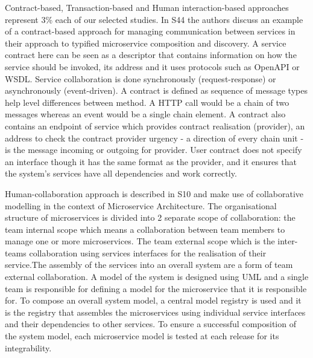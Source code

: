\documentclass{article}
\begin{document}
\begin{multicols}{2}
Contract-based, Transaction-based and Human interaction-based approaches represent 3\% each of our selected studies. In S44 the authors discuss an example of a contract-based approach for managing communication between services in their approach to typified microservice composition and discovery. A service contract here can be seen as a descriptor that contains information on how the service should be invoked, its address and it uses protocols such as OpenAPI or WSDL. Service collaboration is done synchronously (request-response) or asynchronously (event-driven). A contract is defined as sequence of message types help level differences between method.  A HTTP call would be a chain of two messages whereas an event would be a single chain element. A contract also contains an endpoint of service which provides contract realisation (provider), an address to check the contract provider urgency - a direction of every chain unit - is the message incoming or outgoing for provider. User contract does not specify an interface though it has the same format as the provider, and it ensures that the system’s services have all dependencies and work correctly.

Human-collaboration approach is described in S10 and make use of collaborative modelling in the context of Microservice Architecture. The organisational structure  of microservices is divided into 2 separate scope of collaboration: the team internal scope which means a collaboration between team members to manage one or more microservices. The team external scope which is the inter-teams collaboration using services interfaces for the realisation of their service.The assembly of the services into an overall system are a form of team external collaboration. A model of the system is designed using UML and a single team is responsible for defining a model for the microservice that it is responsible for. To compose an overall system model, a central model registry is used and it is the registry that assembles the microservices using individual service interfaces and their dependencies to other services. To ensure a successful composition of the system model, each microservice model is tested at each release for its integrability.


\end{multicols}
\end{document}
